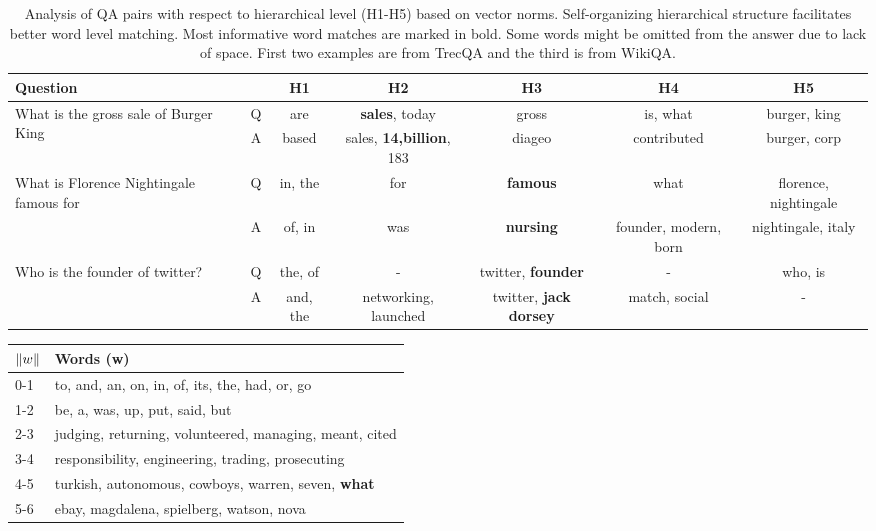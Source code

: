 \documentclass[sigconf]{acmart}
\DeclarePairedDelimiter\norm{\lVert}{\rVert}\fancyhead{}
\begin{document}
\begin{table*}[htbp]
  \centering
  \small
  
    \begin{tabular}{l|c|c|c|c|c|c}
    \hline
         Question &       & H1     & H2 & H3 & H4 & H5 \\
          \hline
    \multirow{2}[0]{*}{What is the gross sale of Burger King} & Q & are   & \textbf{sales}, today & gross & is, what & burger, king  \\
          & A& based & sales, \textbf{14,billion}, 183 & diageo & contributed & burger, corp  \\
          \hline
    \multirow{2}[0]{*}{What is Florence Nightingale famous for} & Q & in, the & for   & \textbf{famous} & what  & florence, nightingale \\
          & A & of, in & was   & \textbf{nursing} & founder, modern, born & nightingale, italy   \\
          \hline
    \multirow{2}[0]{*}{Who is the founder of twitter?} & Q & the, of & -     & twitter, \textbf{founder} & - & who, is  \\
          & A & and, the & networking, launched & twitter, \textbf{jack dorsey}& match, social & -       \\
          \hline
    
    \end{tabular}\caption{Analysis of QA pairs with respect to hierarchical level (H1-H5) based on vector norms. Self-organizing hierarchical structure facilitates better word level matching. Most informative word matches are marked in bold. Some words might be omitted from the answer due to lack of space. First two examples are from TrecQA and the third is from WikiQA. }
  \label{tab:big_table}\end{table*}\begin{table}[htbp]

  \centering
  \small
    \begin{tabular}{ll}
    \hline
    $\norm{w}$  & Words (w) \\
    \hline
    0-1   & to, and, an, on, in, of, its, the, had, or, go \\
    1-2      & be, a, was, up, put, said, but  \\
      2-3    & judging, returning, volunteered, managing, meant, cited \\
      3-4    &  responsibility, engineering, trading, prosecuting\\
      4-5    & turkish, autonomous, cowboys, warren, seven, \textbf{what} \\
       5-6   & ebay, magdalena, spielberg, watson, nova  \\
       \hline
    \end{tabular}






\end{table}
\end{document}
